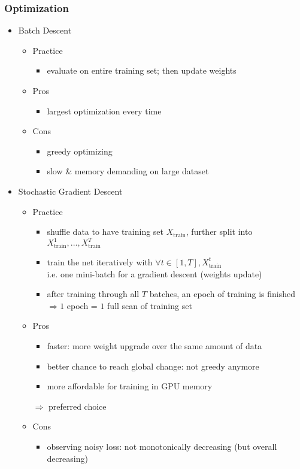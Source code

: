 \subsubsection{Optimization}
\begin{itemize}
\item Batch Descent
	\begin{itemize}
	\item Practice
		\begin{itemize}
		\item evaluate on entire training set; then update weights
		\end{itemize}
	\item Pros
		\begin{itemize}
		\item largest optimization every time
		\end{itemize}
	\item Cons
		\begin{itemize}
		\item greedy optimizing
		\item slow \& memory demanding on large dataset
		\end{itemize}
	\end{itemize}

\item Stochastic Gradient Descent
	\begin{itemize}
	\item Practice
		\begin{itemize}
		\item shuffle data to have training set $X_\text{train}$, further split into $X_\text{train}^{1}, ..., X_\text{train}^{T}$
		\item train the net iteratively with $\forall t\in[1,T], X_\text{train}^t$ \\
		i.e. one mini-batch for a gradient descent (weights update)
		\item after training through all $T$ batches, an epoch of training is finished \\
		$\Rightarrow 1$ epoch = $1$ full scan of training set
		\end{itemize}
	\item Pros
		\begin{itemize}
		\item faster: more weight upgrade over the same amount of data
		\item better chance to reach global change: not greedy anymore
		\item more affordable for training in GPU memory
		\end{itemize}
		$\Rightarrow$ preferred choice
	\item Cons
		\begin{itemize}
		\item observing noisy loss: not monotonically decreasing (but overall decreasing)
		\end{itemize}
	\end{itemize}
	

\end{itemize}
